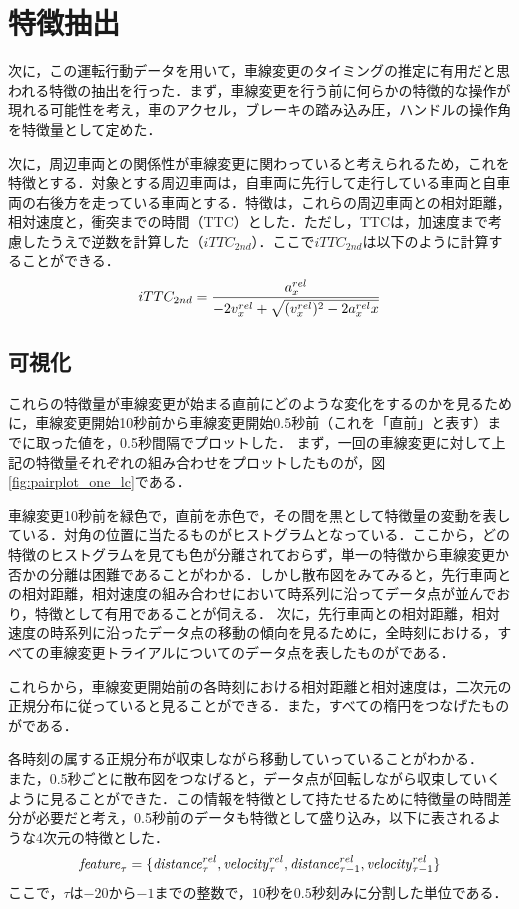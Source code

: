 \section{特徴抽出}
次に，この運転行動データを用いて，車線変更のタイミングの推定に有用だと思われる特徴の抽出を行った．まず，車線変更を行う前に何らかの特徴的な操作が現れる可能性を考え，車のアクセル，ブレーキの踏み込み圧，ハンドルの操作角を特徴量として定めた．
\par
次に，周辺車両との関係性が車線変更に関わっていると考えられるため，これを特徴とする．対象とする周辺車両は，自車両に先行して走行している車両と自車両の右後方を走っている車両とする．特徴は，これらの周辺車両との相対距離，相対速度と，衝突までの時間（TTC）とした．ただし，TTCは，加速度まで考慮したうえで逆数を計算した（$iTTC_{2nd}$）．ここで$iTTC_{2nd}$は以下のように計算することができる．
\begin{align}
  iTTC_{2nd}=\frac{a_x^{rel}}{-2v_x^{rel}+\sqrt{(v_x^{rel})^2-2{a_x^{rel}}x}}
\end{align}


\subsection{可視化}
これらの特徴量が車線変更が始まる直前にどのような変化をするのかを見るために，車線変更開始10秒前から車線変更開始0.5秒前（これを「直前」と表す）までに取った値を，0.5秒間隔でプロットした．
まず，一回の車線変更に対して上記の特徴量それぞれの組み合わせをプロットしたものが，図\ref{fig:pairplot_one_lc}である．

車線変更10秒前を緑色で，直前を赤色で，その間を黒として特徴量の変動を表している．対角の位置に当たるものがヒストグラムとなっている．ここから，どの特徴のヒストグラムを見ても色が分離されておらず，単一の特徴から車線変更か否かの分離は困難であることがわかる．しかし散布図をみてみると，先行車両との相対距離，相対速度の組み合わせにおいて時系列に沿ってデータ点が並んでおり，特徴として有用であることが伺える．
次に，先行車両との相対距離，相対速度の時系列に沿ったデータ点の移動の傾向を見るために，全時刻における，すべての車線変更トライアルについてのデータ点を表したものがである．

これらから，車線変更開始前の各時刻における相対距離と相対速度は，二次元の正規分布に従っていると見ることができる．また，すべての楕円をつなげたものがである．

各時刻の属する正規分布が収束しながら移動していっていることがわかる．
\\
また，0.5秒ごとに散布図をつなげると，データ点が回転しながら収束していくように見ることができた．この情報を特徴として持たせるために特徴量の時間差分が必要だと考え，0.5秒前のデータも特徴として盛り込み，以下に表されるような4次元の特徴とした．
\begin{align}
  \mathit{feature}_\tau=\{\mathit{distance}_{\tau}^{rel},\mathit{velocity}_{\tau}^{rel},\mathit{distance}_{\tau-1}^{rel},\mathit{velocity}_{\tau-1}^{rel}\}
\end{align}
ここで，$\tau$は$-20$から$-1$までの整数で，$10$秒を$0.5$秒刻みに分割した単位である．
